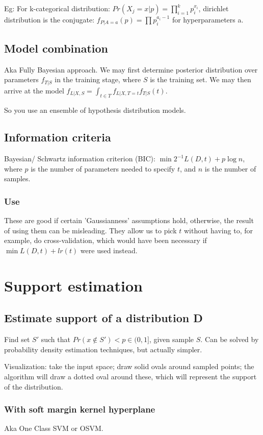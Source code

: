 \documentclass[oneside, article]{memoir}
\begin{document}
Eg: For k-categorical distribution: $Pr(X_{j}=x|p) = \prod_{i=1}^{k} p_{i}^{x_{i}}$, dirichlet distribution is the conjugate: $f_{P|A=a}(p) = \prod p_{i}^{a_{i}-1}$ for hyperparameters a.

\section{Model combination}
Aka Fully Bayesian approach. We may first determine posterior distribution over parameters $f_{T|S}$ in the training stage, where $S$ is the training set. We may then arrive at the model $f_{L|X, S} = \int_{t \in T} f_{L|X, T=t}f_{T|S}(t)$.

So you use an ensemble of hypothesis distribution models.


\section{Information criteria}
Bayesian/ Schwartz information criterion (BIC): $\min 2^{-1}L(D, t) + p \log n$, where $p$ is the number of parameters needed to specify $t$, and $n$ is the number of samples.

\subsection{Use}
These are good if certain 'Gaussianness' assumptions hold, otherwise, the result of using them can be misleading. They allow us to pick $t$ without having to, for example, do cross-validation, which would have been necessary if $\min L(D, t) + l r(t)$ were used instead.

\chapter{Support estimation}

\section{Estimate support of a distribution D}
Find set $S'$ such that $Pr(x \notin S')<p \in (0,1]$, given sample $S$. Can be solved by probability density estimation techniques, but actually simpler.

Visualization: take the input space; draw solid ovals around sampled points; the algorithm will draw a dotted oval around these, which will represent the support of the distribution.


\subsection{With soft margin kernel hyperplane}
Aka One Class SVM or OSVM.
\end{document}
